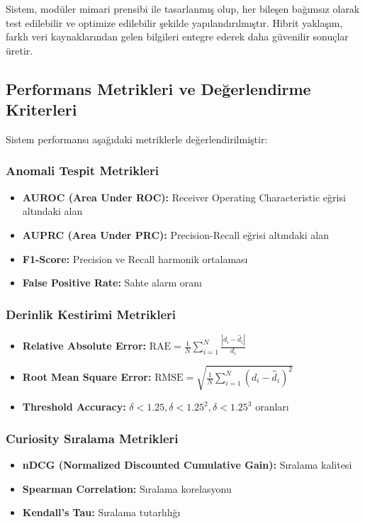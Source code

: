 \documentclass[12pt]{article}
\begin{document}
Sistem, modüler mimari prensibi ile tasarlanmış olup, her bileşen bağımsız olarak test edilebilir ve optimize edilebilir şekilde yapılandırılmıştır. Hibrit yaklaşım, farklı veri kaynaklarından gelen bilgileri entegre ederek daha güvenilir sonuçlar üretir.

\subsection{Performans Metrikleri ve Değerlendirme Kriterleri}
Sistem performansı aşağıdaki metriklerle değerlendirilmiştir:

\subsubsection{Anomali Tespit Metrikleri}
\begin{itemize}
\item \textbf{AUROC (Area Under ROC):} Receiver Operating Characteristic eğrisi altındaki alan
\item \textbf{AUPRC (Area Under PRC):} Precision-Recall eğrisi altındaki alan
\item \textbf{F1-Score:} Precision ve Recall harmonik ortalaması
\item \textbf{False Positive Rate:} Sahte alarm oranı
\end{itemize}

\subsubsection{Derinlik Kestirimi Metrikleri}
\begin{itemize}
\item \textbf{Relative Absolute Error:} \(\text{RAE} = \frac{1}{N} \sum_{i=1}^{N} \frac{|d_i - \hat{d}_i|}{d_i}\)
\item \textbf{Root Mean Square Error:} \(\text{RMSE} = \sqrt{\frac{1}{N} \sum_{i=1}^{N} (d_i - \hat{d}_i)^2}\)
\item \textbf{Threshold Accuracy:} \(\delta < 1.25, \delta < 1.25^2, \delta < 1.25^3\) oranları
\end{itemize}

\subsubsection{Curiosity Sıralama Metrikleri}
\begin{itemize}
\item \textbf{nDCG (Normalized Discounted Cumulative Gain):} Sıralama kalitesi
\item \textbf{Spearman Correlation:} Sıralama korelasyonu
\item \textbf{Kendall's Tau:} Sıralama tutarlılığı
\end{itemize}
\end{document}

